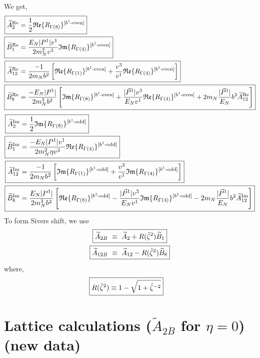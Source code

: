 \documentclass[]{article}
\numberwithin{equation}{section}
\newcommand{\tAmp}{\widetilde{A}}
\newcommand{\tBmp}{\widetilde{B}}
\newcommand{\tAmp}{\ensuremath{\widetilde{A}^{(+)}}}
\newcommand{\tBmp}{\ensuremath{\widetilde{B}^{(+)}}}
\newcommand{\bvec}{b}
\newcommand{\mN}{m_N}
\newcommand{\zetahat}{{\hat \zeta}}
\begin{document}
We get,
\begin{align}
    \Aboxed{\tAmp^{\text{Re}}_2 = & \frac{1}{2}\mathfrak{Re}\{ R_{\Gamma(8)}\}^{[b^{1}\text{-even}]} }\\
    \Aboxed{\tBmp^{\text{Re}}_1 = & \frac{E_{N}|P^1|v^1}{2\mN^2  v^3} \mathfrak{Im}\{ R_{\Gamma(4)}\}^{[b^{1}\text{-even}]}}\\
    \Aboxed{\tAmp^{\text{Re}}_{12}=&\frac{-1}{2\mN  \bvec^2}\left[\mathfrak{Re}\{ R_{\Gamma(1)}\}^{[b^{1}\text{-even}]}+\frac{v^3}{v^1}\mathfrak{Re}\{ R_{\Gamma(4)}\}^{[b^{1}\text{-even}]}\right]}\\
    \Aboxed{\tBmp^{\text{Re}}_8=&\frac{-E_N |P^1|}{ 2\mN^3 \bvec^2 }\left[\mathfrak{Im}\{ R_{\Gamma(8)}\}^{[b^{1}\text{-even}]}+\frac{|\vec{P}^1|v^3}{E_N v^1}\mathfrak{Re}\{ R_{\Gamma(4)}\}^{[b^{1}\text{-even}]}+ 2\mN  \frac{|\vec{P}^1|}{E_N} \bvec^2  \tAmp^{\text{Re}}_{12}\right]}
\end{align}
\begin{align}
    \Aboxed{\tAmp^{\text{Im}}_2 = & \frac{1}{2}\mathfrak{Im}\{ R_{\Gamma(8)}\}^{[b^{1}\text{-odd}]} }\\
    \Aboxed{\tBmp^{\text{Im}}_1 = & \frac{-E_{N}|P^1|v^1}{2\mN^2 \eta v^3} \mathfrak{Re}\{ R_{\Gamma(4)}\}^{[b^{1}\text{-odd}]}}\\
    \Aboxed{\tAmp^{\text{Im}}_{12}=&\frac{-1}{2\mN  \bvec^2}\left[\mathfrak{Im}\{ R_{\Gamma(1)}\}^{[b^{1}\text{-odd}]}+\frac{v^3}{v^1}\mathfrak{Im}\{ R_{\Gamma(4)}\}^{[b^{1}\text{-odd}]}\right]}\\
     \Aboxed{\tBmp^{\text{Im}}_8=&\frac{E_N|P^1|}{ 2\mN^3 \bvec^2  }\left[\mathfrak{Re}\{ R_{\Gamma(8)}\}^{[b^{1}\text{-odd}]}-\frac{|\vec{P}^1|v^3}{E_N v^1}\mathfrak{Im}\{ R_{\Gamma(4)}\}^{[b^{1}\text{-odd}]}- 2\mN  \frac{|\vec{P}^1|}{E_N} \bvec^2  \tAmp^{\text{Im}}_{12}\right]}
\end{align}
To form Sivers shift, we use
\begin{align}
    \Aboxed{\tAmp_{2B}  & \ \equiv\  \tAmp_2 + R(\zetahat^2) \tBmp_1}\\
    \Aboxed{\tAmp_{12B}  & \ \equiv\  \tAmp_{12} - R(\zetahat^2) \tBmp_8}
\end{align}
where,
\begin{align}
    \Aboxed{R(\zetahat^2) \equiv 1- \sqrt{1 + \hat \zeta^{-2}}}
\end{align}

\section{Lattice calculations ($\tAmp_{2B}$ for $\eta=0$) (new data)}
\end{document}
